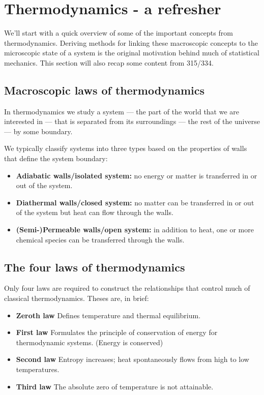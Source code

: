 \section{Thermodynamics - a refresher}
We'll start with a quick overview of some of the important concepts from thermodynamics. Deriving methods for linking these macroscopic concepts to the microscopic state of a system is the original motivation behind much of statistical mechanics. This section will also recap some content from 315/334.

\subsection{Macroscopic laws of thermodynamics}
In thermodynamics we study a system --- the part of the world that we are interested in --- that is separated from its surroundings --- the rest of the universe --- by some boundary.

We typically classify systems into three types based on the properties of walls that define the system boundary:
\begin{itemize}
\item {\bf Adiabatic walls/isolated system:} no energy or matter is transferred in or out of the system.
\item {\bf Diathermal walls/closed system:} no matter can be transferred in or out of the system but heat can flow through the walls.
\item {\bf (Semi-)Permeable walls/open system:}  in addition to heat, one or more chemical species can be transferred through the walls. 
\end{itemize}

\subsection*{The four laws of thermodynamics}
Only four laws are required to construct the relationships that control much of classical thermodynamics. Theses are, in brief:
\begin{itemize}
\item {\bf Zeroth law} Defines temperature and thermal equilibrium. 
\item {\bf First law} Formulates the principle of conservation of energy for thermodynamic systems. (Energy is conserved)
\item {\bf Second law} Entropy increases; heat spontaneously flows from high to low temperatures.
\item {\bf Third law} The absolute zero of temperature is not attainable.  
\end{itemize}


